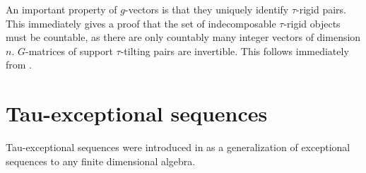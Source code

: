 \documentclass[]{article}
\theoremstyle{definition}
\newcommand{\tu}{\ensuremath{\tau}}
\begin{document}
An important property of $g$-vectors is that they uniquely identify $\tau$-rigid pairs\cite[Theorem 5.5]{tau}. This immediately gives a proof that the set of indecomposable \tu-rigid objects must be countable, as there are only countably many integer vectors of dimension $n$. $G$-matrices of support \tu-tilting pairs are invertible. This follows immediately from \cite[Theorem 5.1]{tau}.



\section{Tau-exceptional sequences}
Tau-exceptional sequences were introduced in \cite{buantau2020} as a generalization of exceptional sequences to any finite dimensional algebra.





\printbibliography
\end{document}
